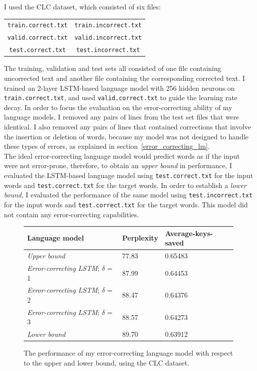 \documentclass[a4paper, 12pt]{report}
\newcommand{\tbf}[1]{\textbf{#1}}
\newcommand{\ttt}[1]{\texttt{#1}}
\newcommand{\tit}[1]{\textit{#1}}
\begin{document}
I used the CLC dataset, which consisted of six files:
\begin{center}
\begin{tabular}{c c}
	\ttt{train.correct.txt} & \ttt{train.incorrect.txt} \\
	\ttt{valid.correct.txt} & \ttt{valid.incorrect.txt} \\
	\ttt{test.correct.txt} & \ttt{test.incorrect.txt}
\end{tabular}
\end{center}
The training, validation and test sets all consisted of one file containing uncorrected text and another file containing the corresponding corrected text. I trained an 2-layer LSTM-based language model with 256 hidden neurons on \ttt{train.correct.txt}, and used \ttt{valid.correct.txt} to guide the learning rate decay. In order to focus the evaluation on the error-correcting ability of my language models, I removed any pairs of lines from the test set files that were identical. I also removed any pairs of lines that contained corrections that involve the insertion or deletion of words, because my model was not designed to handle these types of errors, as explained in section~\ref{error_correcting_lm}. \\

The ideal error-correcting language model would predict words as if the input were not error-prone, therefore, to obtain an \tit{upper bound} in performance, I evaluated the LSTM-based language model using \ttt{test.correct.txt} for the input words and \ttt{test.correct.txt} for the target words. In order to establish a \tit{lower bound}, I evaluated the performance of the same model using \ttt{test.incorrect.txt} for the input words and \ttt{test.correct.txt} for the target words. This model did not contain any error-correcting capabilities. \\

\begin{figure}[h]
\captionsetup{justification=centering}
\begin{adjustbox}{center}
\begin{tabular}{| L{6cm} | C{3cm} | C{5cm} |}
	\hline
	\tbf{Language model} & \tbf{Perplexity} & \tbf{Average-keys-saved} \\ \hline
	\tit{Upper bound} & 77.83 & 0.65483 \\ \hline
	\tit{Error-correcting LSTM}; $\delta$ = 1 & 87.99 & 0.64453 \\ \hline
	\tit{Error-correcting LSTM}; $\delta$ = 2 & 88.47 & 0.64376 \\ \hline
	\tit{Error-correcting LSTM}; $\delta$ = 3 & 88.57 & 0.64273 \\ \hline
	\tit{Lower bound} & 89.70 & 0.63912 \\ \hline
\end{tabular}
\end{adjustbox}
\caption{The performance of my error-correcting language model with respect to the upper and lower bound, using the CLC dataset.}
\label{fig:error_correcting_results}
\end{figure}
\end{document}
